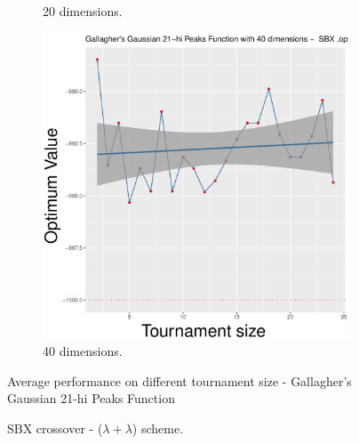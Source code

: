 \begin{figure}[!t]
\begin{subfigure}[b]{0.33\textwidth}
		\caption{20 dimensions.}
	\end{subfigure}
	\begin{subfigure}[b]{0.33\textwidth}
		\centering
		\includegraphics[width=\textwidth]{img/2n2n-40D/multimodal_2n2n_22_dim_40.pdf}
		\caption{40 dimensions.}
	\end{subfigure}
	\caption{SBX crossover - ($\lambda + \lambda$) scheme.}
	\label{sbx-22-B}
	\Large{Average performance on different tournament size - Gallagher's Gaussian 21-hi Peaks Function}
\end{figure}


